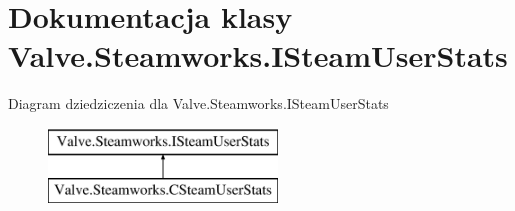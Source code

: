 \hypertarget{class_valve_1_1_steamworks_1_1_i_steam_user_stats}{}\section{Dokumentacja klasy Valve.\+Steamworks.\+I\+Steam\+User\+Stats}
\label{class_valve_1_1_steamworks_1_1_i_steam_user_stats}
Diagram dziedziczenia dla Valve.\+Steamworks.\+I\+Steam\+User\+Stats\begin{figure}[H]
\begin{center}
\leavevmode
\includegraphics[height=2.000000cm]{class_valve_1_1_steamworks_1_1_i_steam_user_stats}
\end{center}
\end{figure}
